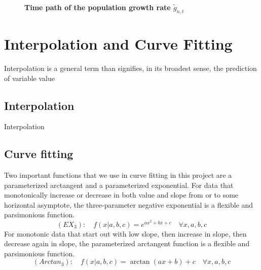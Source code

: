 \documentclass[letterpaper,12pt]{article}
\theoremstyle{definition}
\begin{document}
    \begin{figure}[htbp]\centering \captionsetup{width=4.0in}
      \caption{\label{FigGrowthPath}\textbf{Time path of the population growth rate $\tilde{g}_{n,t}$}}
    \end{figure}


\section{Interpolation and Curve Fitting}\label{SecInterpCurvFit}

  Interpolation is a general term than signifies, in its broadest sense, the prediction of variable value

  \subsection{Interpolation}\label{SecInterp}

    Interpolation


  \subsection{Curve fitting}\label{SecCurvFit}

    Two important functions that we use in curve fitting in this project are a parameterized arctangent and a parameterized exponential. For data that monotonically increase or decrease in both value and slope from or to some horizontal asymptote, the three-parameter negative exponential is a flexible and parsimonious function.
    \begin{equation}\label{EqExp3param}
      (EX_3):\quad f(x|a,b,c) = e^{ax^2 + bx + c} \quad\forall x, a, b, c
    \end{equation}
    For monotonic data that start out with low slope, then increase in slope, then decrease again in slope, the parameterized arctangent function is a flexible and parsimonious function.
    \begin{equation}\label{EqArctan3param}
      (Arctan_3):\quad f(x|a,b,c) = \arctan\left(ax + b\right) + c \quad\forall x, a, b, c
    \end{equation}
\end{document}
